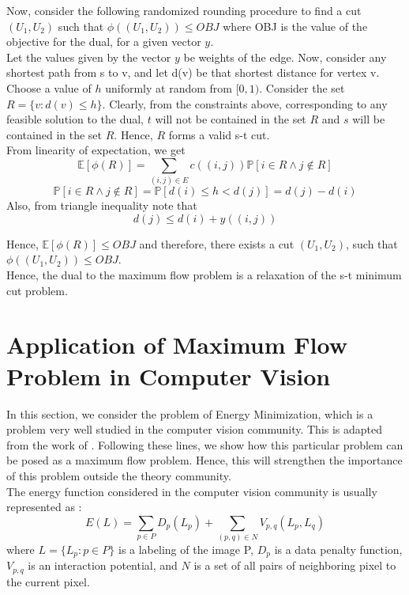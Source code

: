 \documentclass[BTech]{iitmdiss}
\begin{document}
	  Now, consider the following randomized rounding procedure to find a cut $(U_1, U_2)$ such that $\phi((U_1, U_2)) \leq OBJ$ where OBJ is 
	  the value of the objective for the dual, for a given vector $y$. \\
	  
	  Let the values given by the vector $y$ be weights of the edge. Now, consider any shortest path from s to v, and let d(v) be that 
	  shortest distance for vertex v. Choose a value of $h$ uniformly at random from $[0,1)$. Consider the set 
	  $R = \{v:d(v) \leq h\}$. Clearly, from the constraints above, corresponding to any feasible solution to the dual, $t$ will not be contained 
	  in the set $R$ and $s$ will be contained in the set $R$. Hence, $R$ forms a valid s-t cut. \\
	  
	  From linearity of expectation, we get
	  $$\mathbb{E}[\phi(R)] = \displaystyle\sum_{(i,j) \in E} c((i,j)) \mathbb{P}[i \in R \wedge j \notin R]$$
	  $$\mathbb{P}[i \in R \wedge j \notin R] = \mathbb{P}[d(i) \leq h < d(j)] = d(j)-d(i)$$
	  Also, from triangle inequality note that 
	  $$d(j) \leq d(i) + y((i,j))$$
	  
	  Hence, $\mathbb{E}[\phi(R)] \leq OBJ$ and therefore, there exists a cut $(U_1,U_2)$, such that $\phi((U_1, U_2)) \leq OBJ$. \\
	  
	  Hence, the dual to the maximum flow problem is a relaxation of the s-t minimum cut problem.
	  
	  \section{Application of Maximum Flow Problem in Computer Vision}
	    In this section, we consider the problem of Energy Minimization, which is a problem very well studied in the computer vision community.
	  This is adapted from the work of \cite{Boykov:2004:ECM:1018034.1018355}. Following these lines, we show how this particular problem can be posed as a maximum flow problem. Hence, this will
	  strengthen the importance of this problem outside the theory community. \\
	  
	  The energy function considered in the computer vision community is usually represented as :
	  $$E(L) = \displaystyle\sum_{p \in P} D_{p}(L_{p}) + \displaystyle\sum_{(p,q) \in N} V_{p,q}(L_p, L_q)$$
	  where 
	  $L = \{L_p : p \in P\}$ is a labeling of the image P, $D_p$ is a data penalty function, $V_{p,q}$ is an interaction potential, and 
	  $N$ is a set of all pairs of neighboring pixel to the current pixel. \\
	  
\end{document}

